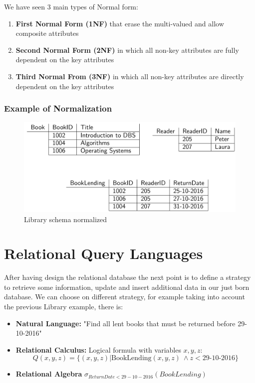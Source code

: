 We have seen 3 main types of Normal form:
\begin{enumerate}
    \item \textbf{First Normal Form (1NF)} that erase the multi-valued and allow composite attributes
    \item \textbf{Second Normal Form (2NF)} in which all non-key attributes are fully dependent on the key attributes
    \item \textbf{Third Normal From (3NF)} in which all non-key attributes are directly dependent on the key attributes
\end{enumerate}

\newpage
\subsubsection{Example of Normalization}
\begin{figure}[!hbp]
    \centering
    \includegraphics[width=0.70\linewidth]{images/AdvancedDataManagment/rdbms/normalization.jpeg}
    \caption{Library schema normalized}
\end{figure}

\section{Relational Query Languages}
After having design the relational database the next point is to define a strategy to retrieve some information, update and insert additional data in our just born database. We can choose on different strategy, for example taking into account the previous Library example, there is:
\begin{itemize}
    \item \textbf{Natural Language:} "Find all lent books that must be returned before 29-10-2016"
    \item \textbf{Relational Calculus:} Logical formula with variables \(x, y, z:\)
    \[Q(x,y,z) = \{(x,y,z)|\text{BookLending}(x,y,z)\ \land z < \text{29-10-2016}\}\]
    \item \textbf{Relational Algebra} \(\sigma_{ReturnDate<29-10-2016}(BookLending)\)
\end{itemize}

